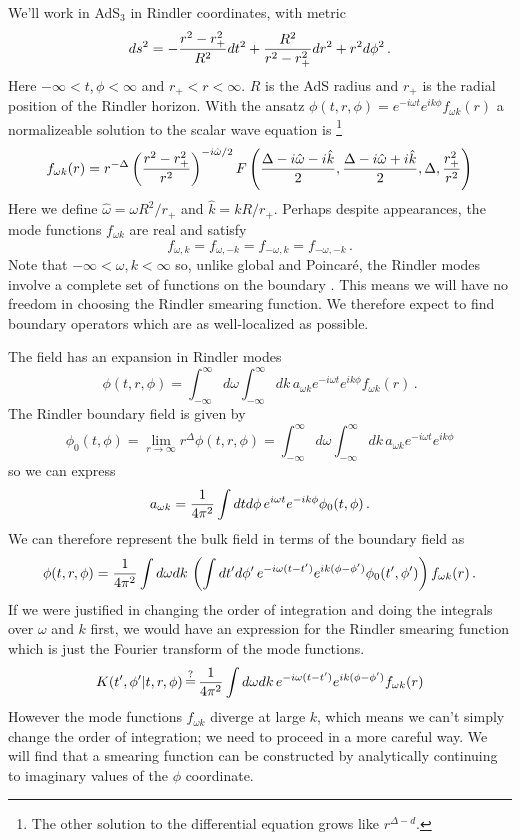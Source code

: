 \documentclass[12pt]{article}
\newcommand{\be}{\begin{equation}}
\newcommand{\ee}{\end{equation}}
\newcommand{\hw}{\hat{\omega}}
\newcommand{\hk}{\hat{k}}
\begin{document}
We'll work in AdS${}_3$ in Rindler coordinates, with metric
\[
ds^2 = - {r^2 - r_+^2 \over R^2} dt^2 + {R^2 \over r^2 - r_+^2} dr^2
+ r^2 d\phi^2\,.
\]
Here $-\infty < t,\phi < \infty$ and $r_+ < r < \infty$.  $R$ is the
AdS radius and $r_+$ is the radial position of the Rindler horizon.
With the ansatz $\phi(t,r,\phi) = e^{-i \omega t} e^{i k \phi}
f_{\omega k}(r)$ a normalizeable solution to the scalar wave equation
is \cite{Ichinose:1994rg,Keski-Vakkuri:1998nw}\footnote{The other
solution to the differential equation grows like $r^{\Delta - d}$.}
\[
f_{\omega k}(r) = r^{-\Delta}
                  \left({r^2 - r_+^2 \over r^2}\right)^{-i \hw / 2}
                  F\left({\Delta - i \hw - i \hk \over 2},
                    {\Delta - i \hw + i \hk \over 2},
                    \Delta,{r_+^2 \over r^2}\right)
\]
Here we define $\hw = \omega R^2 / r_+$ and $\hk = k R / r_+$.
Perhaps despite appearances, the mode functions $f_{\omega k}$ are
real and satisfy
\[
f_{\omega,k} = f_{\omega,-k} = f_{-\omega,k} = f_{-\omega,-k}\,.
\]
Note that $-\infty < \omega,k < \infty$ so, unlike global and
Poincar\'e, the Rindler modes involve a complete set of functions on
the boundary \cite{Unruh:1976db}.  This means we will have no freedom
in choosing the Rindler smearing function.  We therefore expect to
find boundary operators which are as well-localized as possible.

The field has an expansion in Rindler modes
\[
\phi(t,r,\phi) = \int_{-\infty}^\infty d\omega \int_{-\infty}^\infty dk \,
a_{\omega k} e^{-i \omega t} e^{i k \phi} f_{\omega k}(r)\,.
\]
The Rindler boundary field is given by
\[
\phi_0(t,\phi) = \lim_{r \rightarrow \infty} r^\Delta \phi(t,r,\phi) =
\int_{-\infty}^\infty d\omega \int_{-\infty}^\infty dk \, a_{\omega k}
e^{-i \omega t} e^{i k \phi}
\]
so we can express
\[
a_{\omega k} = {1 \over 4 \pi^2} \int dt d\phi \, e^{i \omega t} e^{-i k \phi} \phi_0(t,\phi)\,.
\]
We can therefore represent the bulk field in terms of the boundary field as
%
\be
\label{RindlerId}
\phi(t,r,\phi) = {1 \over 4 \pi^2} \int d\omega dk \, \left(\int dt' d\phi' \, e^{- i \omega (t - t')}
e^{i k (\phi - \phi')} \phi_0(t',\phi')\right) f_{\omega k}(r)\,.
\ee
%
If we were justified in changing the order of integration and doing
the integrals over $\omega$ and $k$ first, we would have an expression
for the Rindler smearing function which is just the Fourier transform
of the mode functions.
\begin{equation}
\label{DoesntWork}
K(t',\phi' \vert t,r,\phi) \mathop=^? {1 \over 4 \pi^2} \int d\omega dk \, e^{- i \omega (t - t')}
e^{i k (\phi - \phi')} f_{\omega k}(r)
\end{equation}
However the mode functions $f_{\omega k}$ diverge at large $k$, which
means we can't simply change the order of integration; we need to
proceed in a more careful way. We will find that a smearing function
can be constructed by analytically continuing to imaginary values of
the $\phi$ coordinate.
\end{document}
